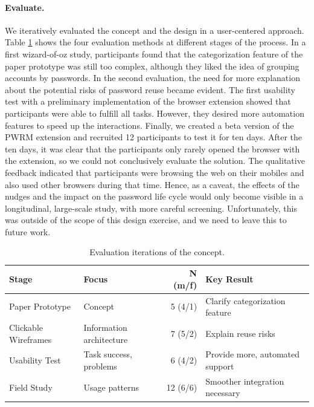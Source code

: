 \paragraph{Evaluate.} 
We iteratively evaluated the concept and the design in a user-centered approach. Table \ref{tab:pwrm:evaluations} shows the four evaluation methods at different stages of the process. In a first wizard-of-oz study, participants found that the categorization feature of the paper prototype was still too complex, although they liked the idea of grouping accounts by passwords. In the second evaluation, the need for more explanation about the potential risks of password reuse became evident. The first usability test with a preliminary implementation of the browser extension showed that participants were able to fulfill all tasks. However, they desired more automation features to speed up the interactions. Finally, we created a beta version of the PWRM extension and recruited 12 participants to test it for ten days. After the ten days, it was clear that the participants only rarely opened the browser with the extension, so we could not conclusively evaluate the solution. The qualitative feedback indicated that participants were browsing the web on their mobiles and also used other browsers during that time. Hence, as a caveat, the effects of the nudges and the impact on the password life cycle would only become visible in a longitudinal, large-scale study, with more careful screening. Unfortunately, this was outside of the scope of this design exercise, and we need to leave this to future work. 

\begin{table}
	\begin{tabular}{llrp{9cm}}
		\textbf{Stage} & \textbf{Focus} & \textbf{N} (m/f) & \textbf{Key Result}\\ \hline
		Paper Prototype & Concept & 5 (4/1) & Clarify categorization feature \\
		Clickable Wireframes & Information architecture & 7 (5/2) & Explain reuse risks \\
		Usability Test & Task success, problems & 6 (4/2) & Provide more, automated support \\
		Field Study & Usage patterns & 12 (6/6) & Smoother integration necessary
	\end{tabular}
	\caption{\label{tab:pwrm:evaluations} Evaluation iterations of the concept. }
\end{table}

